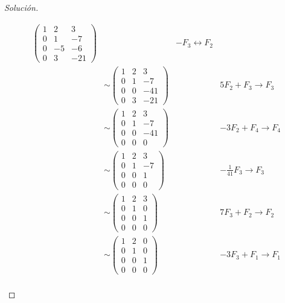 \documentclass[a4,11pt]{aleph-notas}
\begin{document}
\begin{proof}[Solución]
\begin{enumerate}
\begin{align*}
\begin{pmatrix}
            1 & 2 & 3\\
            0 & 1 & -7\\
            0 & -5 & -6\\
            0 & 3 & -21
            \end{pmatrix} &&
            -F_3 \leftrightarrow F_2\\
            & \sim 
            \begin{pmatrix}
            1 & 2 & 3\\
            0 & 1 & -7\\
            0 & 0 & -41\\
            0 & 3 & -21
            \end{pmatrix} &&
            5F_2 + F_3 \to F_3 \\     
            & \sim 
            \begin{pmatrix}
            1 & 2 & 3\\
            0 & 1 & -7\\
            0 & 0 & -41\\
            0 & 0 & 0
            \end{pmatrix} &&
            -3F_2 + F_4 \to F_4 \\  
            & \sim 
            \begin{pmatrix}
            1 & 2 & 3\\
            0 & 1 & -7\\
            0 & 0 & 1\\
            0 & 0 & 0
            \end{pmatrix} &&
            -\frac{1}{41}F_3 \to F_3\\
            & \sim
             \begin{pmatrix}
            1 & 2 & 3\\
            0 & 1 & 0\\
            0 & 0 & 1\\
            0 & 0 & 0
            \end{pmatrix} &&
            7F_3+F_2 \to F_2\\
            & \sim 
            \begin{pmatrix}
            1 & 2 & 0\\
            0 & 1 & 0\\
            0 & 0 & 1\\
            0 & 0 & 0
            \end{pmatrix} &&
            -3F_3+F_1 \to F_1\\

\end{align*}
\end{enumerate}
\end{proof}
\end{document}
